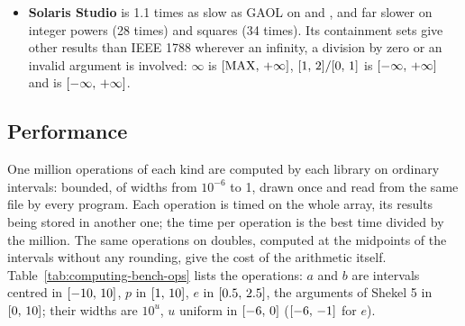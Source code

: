 \begin{itemize}
library's, called with the rounding direction set downward or upward, which
glibc does not always honour: at the points of the test of enclosure,
34\,\% of its results miss the value of the function with glibc 2.43, 20\,\%
with its other policy, and $\itv{-\infty}{+\infty}$\code{)}
misses $\pi/2$. With its default checking it has no empty set: an operation
that would create one throws an exception. It is 6.4 times slower than GAOL on $+$ and $-$, 2.4 to 12.5 times on $\times$, $\div$ and the formulas, 3.4 times on the square root, 4.0 times on the integer power and 1.7 to 1.9 times on the other elementary functions.
\item[$\bullet$] \textbf{Solaris Studio} is 1.1 times as slow as GAOL on  and , and far slower on integer powers (28 times) and squares (34 times). Its
containment sets give other results than IEEE 1788 wherever an infinity, a
division by zero or an invalid argument is involved:
$\infty$\code{)} is $[\mathrm{MAX},\,+\infty]$,
$[1,\,2] / [0,\,1]$ is $\itv{-\infty}{+\infty}$ and
 is $\itv{-\infty}{+\infty}$.
\end{itemize}

\subsection{Performance}
\label{sec:computing-performance}
%

One million operations of each kind are computed by each library on
ordinary intervals: bounded, of widths from $10^{-6}$ to 1, drawn once and
read from the same file by every program. Each operation is timed on the
whole array, its results being stored in another one; the time per
operation is the best time divided by the million. The same operations on
doubles, computed at the midpoints of the intervals without any rounding,
give the cost of the arithmetic itself. Table~\ref{tab:computing-bench-ops}
lists the operations: $a$ and $b$ are intervals centred in $[-10,\,10]$,
$p$ in $[1,\,10]$, $e$ in $[0.5,\,2.5]$, the arguments of Shekel 5 in
$[0,\,10]$; their widths are $10^u$, $u$ uniform in $[-6,\,0]$
($[-6,\,-1]$ for $e$).

